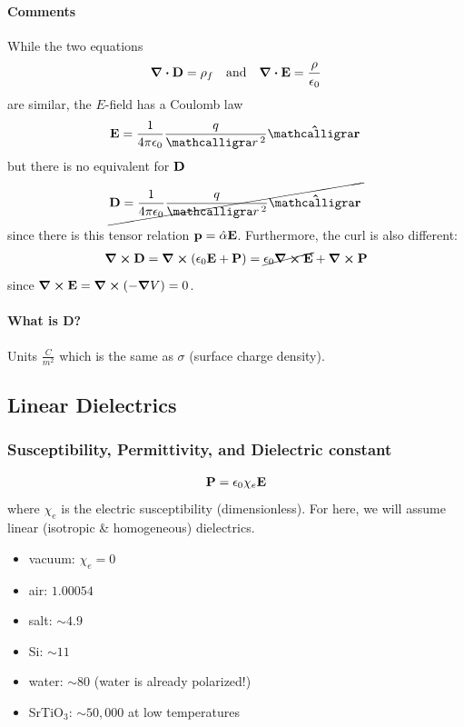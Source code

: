 \documentclass[../main.tex]{subfiles}
\begin{document}
\paragraph{Comments} While the two equations
\begin{align*}
    \div \vb D = \rho_f \qand \div \vb E = \frac{\rho}{\epsilon_0}
\end{align*}
are similar, the $E$-field has a Coulomb law 
\begin{align*}
    \vb E = \ke \frac{q}{\scriptr^2} \vu \scriptr
\end{align*}
but there is no equivalent for $\vb D$
\begin{align*}
    \cancel{\vb D = \ke \frac{q}{\scriptr^2} \vu \scriptr}
\end{align*}
since there is this tensor relation $\vb p = \hat \alpha \vb E$.
Furthermore, the curl is also different:
\begin{align*}
    \curl \vb D = \curl (\epsilon_0 \vb E + \vb P) = \cancel{\epsilon_0 \curl \vb E} + \curl \vb P
\end{align*}
since $\curl \vb E = \curl (-\grad V) = 0$.

\paragraph{What is D?} Units $\si{\frac{C}{m^2}}$ which is the same as $\sigma$ (surface charge density).

\subsection{Linear Dielectrics}

\subsubsection{Susceptibility, Permittivity, and Dielectric constant}
\begin{align*}
    \vb P = \epsilon_0 \chi_e \vb E
\end{align*}
where $\chi_e$ is the electric susceptibility (dimensionless). For here, we will assume linear (isotropic \& homogeneous) dielectrics.
\begin{itemize}
    \item vacuum: $\chi_e = 0$
    \item air: $1.00054$
    \item salt: $\sim 4.9$
    \item Si: $\sim 11$
    \item water: $\sim 80$ (water is already polarized!)
    \item SrTiO$_3$: $\sim 50,000$ at low temperatures
\end{itemize}
\end{document}
